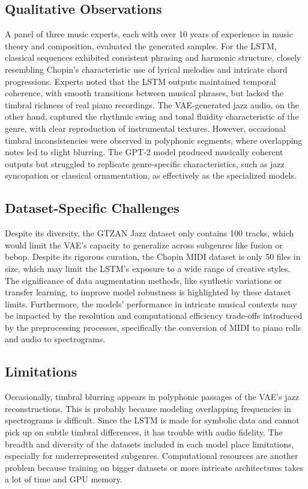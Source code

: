 \documentclass[conference]{IEEEtran}
\begin{document}
\subsection{Qualitative Observations}
A panel of three music experts, each with over 10 years of experience in music theory and composition, evaluated the generated samples. For the LSTM, classical sequences exhibited consistent phrasing and harmonic structure, closely resembling Chopin’s characteristic use of lyrical melodies and intricate chord progressions. Experts noted that the LSTM outputs maintained temporal coherence, with smooth transitions between musical phrases, but lacked the timbral richness of real piano recordings. The VAE-generated jazz audio, on the other hand, captured the rhythmic swing and tonal fluidity characteristic of the genre, with clear reproduction of instrumental textures. However, occasional timbral inconsistencies were observed in polyphonic segments, where overlapping notes led to slight blurring. The GPT-2 model produced musically coherent outputs but struggled to replicate genre-specific characteristics, such as jazz syncopation or classical ornamentation, as effectively as the specialized models.

\subsection{Dataset-Specific Challenges}
Despite its diversity, the GTZAN Jazz dataset only contains 100 tracks, which would limit the VAE's capacity to generalize across subgenres like fusion or bebop.  Despite its rigorous curation, the Chopin MIDI dataset is only 50 files in size, which may limit the LSTM's exposure to a wide range of creative styles.  The significance of data augmentation methods, like synthetic variations or transfer learning, to improve model robustness is highlighted by these dataset limits.  Furthermore, the models' performance in intricate musical contexts may be impacted by the resolution and computational efficiency trade-offs introduced by the preprocessing processes, specifically the conversion of MIDI to piano rolls and audio to spectrograms.

\subsection{Limitations}
Occasionally, timbral blurring appears in polyphonic passages of the VAE's jazz reconstructions. This is probably because modeling overlapping frequencies in spectrograms is difficult.  Since the LSTM is made for symbolic data and cannot pick up on subtle timbral differences, it has trouble with audio fidelity.  The breadth and diversity of the datasets included in each model place limitations, especially for underrepresented subgenres.  Computational resources are another problem because training on bigger datasets or more intricate architectures takes a lot of time and GPU memory.
\end{document}
